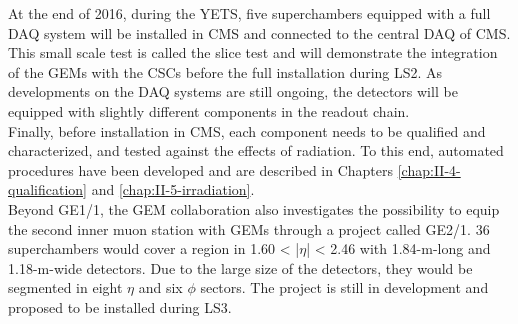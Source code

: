     At the end of 2016, during the YETS, five superchambers equipped with a full DAQ system will be installed in CMS and connected to the central DAQ of CMS. This small scale test is called the slice test and will demonstrate the integration of the GEMs with the CSCs before the full installation during LS2. As developments on the DAQ systems are still ongoing, the detectors will be equipped with slightly different components in the readout chain. \\

    Finally, before installation in CMS, each component needs to be qualified and characterized, and tested against the effects of radiation. To this end, automated procedures have been developed and are described in Chapters \ref{chap:II-4-qualification} and \ref{chap:II-5-irradiation}. \\

    Beyond GE1/1, the GEM collaboration also investigates the possibility to equip the second inner muon station with GEMs through a project called GE2/1. 36 superchambers would cover a region in 1.60 < |$\eta$| < 2.46 with 1.84-m-long and 1.18-m-wide detectors. Due to the large size of the detectors, they would be segmented in eight $ \eta $ and six $ \phi $ sectors. The project is still in development and proposed to be installed during LS3.
